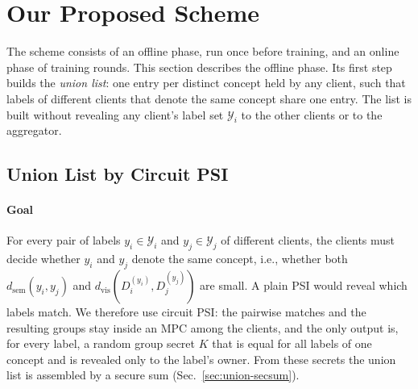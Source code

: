 \section{Our Proposed Scheme}
\label{sec:scheme}

The scheme consists of an offline phase, run once before training, and an online phase of training
rounds. This section describes the offline phase. Its first step builds the \emph{union list}: one
entry per distinct concept held by any client, such that labels of different clients that denote the
same concept share one entry. The list is built without revealing any client's label set
$\mathcal{Y}_i$ to the other clients or to the aggregator.

\subsection{Union List by Circuit PSI}
\label{sec:union}

\paragraph{Goal}
For every pair of labels $y_i\in\mathcal{Y}_i$ and $y_j\in\mathcal{Y}_j$ of different clients, the
clients must decide whether $y_i$ and $y_j$ denote the same concept, i.e., whether both
$d_{\mathrm{sem}}(y_i,y_j)$ and $d_{\mathrm{vis}}(D_i^{(y_i)},D_j^{(y_j)})$ are small. A plain PSI
would reveal which labels match. We therefore use circuit PSI: the pairwise matches and the
resulting groups stay inside an MPC among the clients, and the only output is, for every label, a
random group secret $K$ that is equal for all labels of one concept and is revealed only to the
label's owner. From these secrets the union list is assembled by a secure sum
(Sec.~\ref{sec:union-secsum}).

